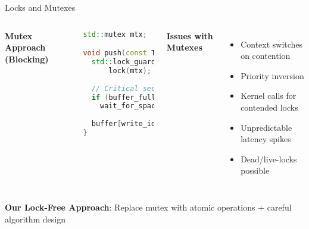 \documentclass{beamer}
\begin{document}
\begin{frame}[fragile]{Locks and Mutexes}
\begin{columns}
\textbf{Mutex Approach (Blocking)}
\begin{lstlisting}[language=C++]
std::mutex mtx;

void push(const T& item) {
  std::lock_guard<std::mutex> 
      lock(mtx);
  
  // Critical section
  if (buffer_full())
    wait_for_space();
    
  buffer[write_idx++] = item;
}
\end{lstlisting}

\textbf{Issues with Mutexes}
\begin{itemize}
    \item Context switches on contention
    \item Priority inversion
    \item Kernel calls for contended locks
    \item Unpredictable latency spikes
    \item Dead/live-locks possible
\end{itemize}
\end{columns}

\textbf{Our Lock-Free Approach}: Replace mutex with atomic operations + careful algorithm design
\end{frame}
\end{document}
